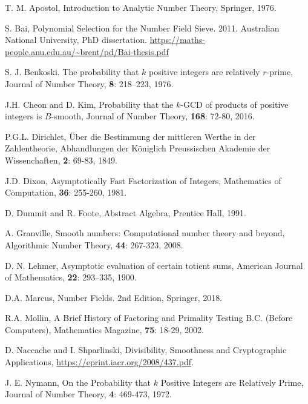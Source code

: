\documentclass[12pt]{amsart}
\theoremstyle{definition}
\begin{document}
\begin{thebibliography}{1}

 T. M. Apostol, Introduction to Analytic Number Theory, Springer, 1976.

 S. Bai, Polynomial Selection for the Number Field Sieve. 2011. Australian National University, PhD dissertation. \url{https://maths-people.anu.edu.au/~brent/pd/Bai-thesis.pdf} %

 S. J. Benkoski. The probability that $k$ positive integers are relatively $r$-prime, Journal of Number Theory, \textbf{8}: 218–223, 1976.

 J.H. Cheon and D. Kim, Probability that the $k$-GCD of products of positive integers is $B$-smooth, Journal of Number Theory, \textbf{168}: 72-80, 2016.

 P.G.L. Dirichlet, \"{U}ber die Bestimmung der mittleren Werthe in der Zahlentheorie, Abhandlungen der K\"{o}niglich Preussischen Akademie der Wissenchaften, \textbf{2}: 69-83, 1849.

 J.D. Dixon, Asymptotically Fast Factorization of Integers, Mathematics of Computation, \textbf{36}: 255-260, 1981.

 D. Dummit and R. Foote, Abstract Algebra, Prentice Hall, 1991.

 A. Granville, Smooth numbers: Computational number theory and beyond, Algorithmic Number Theory, \textbf{44}: 267-323, 2008.

 D. N. Lehmer, Asymptotic evaluation of certain totient sums, American Journal of Mathematics, \textbf{22}: 293–335, 1900.

 D.A. Marcus, Number Fields. 2nd Edition, Springer, 2018. %

 R.A. Mollin, A Brief History of Factoring and Primality Testing B.C. (Before Computers), Mathematics Magazine, \textbf{75}: 18-29, 2002.

 D. Naccache and I. Shparlinski, Divisibility, Smoothness and Cryptographic Applications,
\url{https://eprint.iacr.org/2008/437.pdf}. %

 J. E. Nymann, On the Probability that $k$ Positive Integers are Relatively Prime, Journal of Number Theory, \textbf{4}: 469-473, 1972.


\end{thebibliography}
\end{document}
